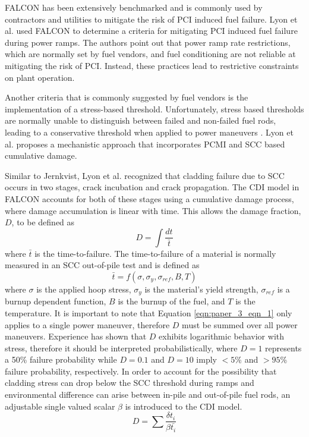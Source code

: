 \documentclass[edeposit,fullpage,11pt]{uiucthesis2009}
\begin{document}
FALCON has been extensively benchmarked and is commonly used by contractors and utilities to mitigate the risk of \gls{PCI} induced fuel failure.
Lyon et al. \cite{lyon_pci_2009} used FALCON  to determine a criteria for mitigating \gls{PCI} induced fuel failure during power ramps.
The authors point out that power ramp rate restrictions, which are normally set by fuel vendors, and fuel conditioning are not reliable at mitigating the risk of \gls{PCI}. 
Instead, these practices lead to restrictive constraints on plant operation.

Another criteria that is commonly suggested by fuel vendors is the implementation of a stress-based threshold.
Unfortunately, stress based thresholds are normally unable to distinguish between failed and non-failed fuel rods, leading to a conservative threshold when applied to power maneuvers \cite{lyon_pci_2009}.
 Lyon et al. proposes a mechanistic approach that incorporates \gls{PCMI} and \gls{SCC} based cumulative damage.

Similar to Jernkvist,  Lyon et al. recognized that cladding failure due to \gls{SCC} occurs in two stages, crack incubation and crack propagation.
The \gls{CDI} model in FALCON accounts for both of these stages using a cumulative damage process, where damage accumulation is linear with time.
This allows the damage fraction, $D$, to be defined as 
\begin{equation}\label{eqn:paper_3_eqn_1}
D = \int \frac{dt}{\bar{t}}
\end{equation}
where $\bar{t}$ is the time-to-failure.
The time-to-failure of a material is normally measured in an \gls{SCC} out-of-pile test and is defined as
\begin{equation}
\bar{t} = f(\sigma,\sigma_y,\sigma_{ref},B,T)
\end{equation}
where $\sigma$ is the applied hoop stress, $\sigma_y$ is the material's yield strength, $\sigma_{ref}$ is a burnup dependent function, $B$ is the burnup of the fuel, and $T$ is the temperature.
It is important to note that Equation \ref{eqn:paper_3_eqn_1} only applies to a single power maneuver, therefore $D$ must be summed over all power maneuvers. 
Experience has shown that $D$ exhibits logarithmic behavior with stress, therefore it should be interpreted probabilistically, where $D=1$ represents a 50\% failure probability while $D=0.1$ and $D=10$ imply  $<5$\% and $>95$\% failure probability, respectively.
In order to account for the possibility that cladding stress can drop below the \gls{SCC} threshold during ramps and environmental difference can arise between in-pile and out-of-pile fuel rods, an adjustable single valued scalar $\beta$ is introduced to the \gls{CDI} model. 
\begin{equation}
D = \sum \frac{\delta t_i}{\beta \bar{t_i}}
\end{equation}
\end{document}
